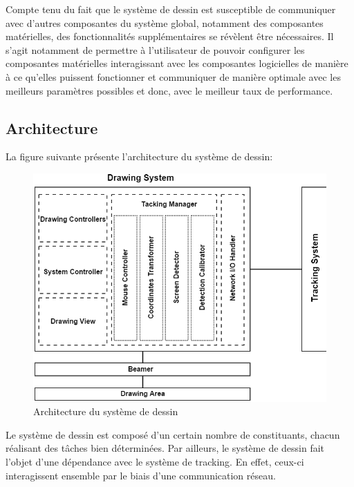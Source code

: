 \documentclass[11pt,a4paper,oldfontcommands]{memoir}
\begin{document}
Compte tenu du fait que le système de dessin est susceptible de communiquer avec d'autres composantes du système global, notamment des composantes matérielles, des fonctionnalités supplémentaires se révèlent être nécessaires. Il s'agit notamment de permettre à l'utilisateur de pouvoir configurer les composantes matérielles interagissant avec les composantes logicielles de manière à ce qu'elles puissent fonctionner et communiquer de manière optimale avec les meilleurs paramètres possibles et donc, avec le meilleur taux de performance.

\newpage

\subsection{Architecture}

La figure suivante présente l'architecture du système de dessin:

\begin{figure}[h]
\centering
\includegraphics[scale=0.7]{images/drawing-system-architecture.png}
\caption{Architecture du système de dessin}
\label{fig:dsa}
\end{figure}

Le système de dessin est composé d'un certain nombre de constituants, chacun réalisant des tâches bien déterminées. Par ailleurs, le système de dessin fait l'objet d'une dépendance avec le système de tracking. En effet, ceux-ci interagissent ensemble par le biais d'une communication réseau.
\end{document}
